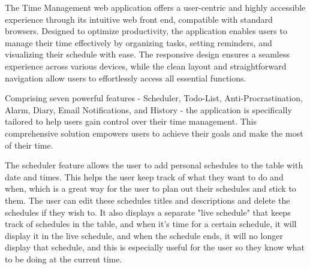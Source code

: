 \documentclass[a4paper]{article}
\begin{document}
The Time Management web application offers a user-centric and highly accessible experience through its intuitive web front end, compatible with standard browsers. Designed to optimize productivity, the application enables users to manage their time effectively by organizing tasks, setting reminders, and visualizing their schedule with ease. The responsive design ensures a seamless experience across various devices, while the clean layout and straightforward navigation allow users to effortlessly access all essential functions.

Comprising seven powerful features - Scheduler, Todo-List, Anti-Procrastination, Alarm, Diary, Email Notifications, and History - the application is specifically tailored to help users gain control over their time management. This comprehensive solution empowers users to achieve their goals and make the most of their time.

The scheduler feature allows the user to add personal schedules to the table with date and times. This helps the user keep track of what they want to do and when, which is a great way for the user to plan out their schedules and stick to them. The user can edit these schedules titles and descriptions and delete the schedules if they wish to. It also displays a separate "live schedule" that keeps track of schedules in the table, and when it's time for a certain schedule, it will display it in the live schedule, and when the schedule ends, it will no longer display that schedule, and this is especially useful for the user so they know what to be doing at the current time.
\end{document}
